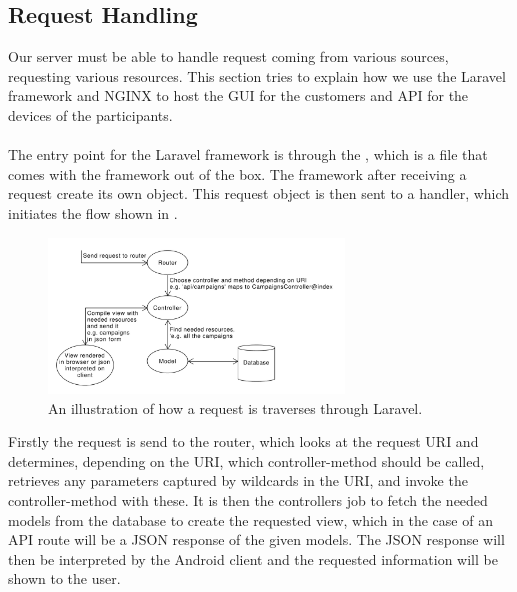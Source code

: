 \subsection{Request Handling}
\label{sub:request_handling}
Our server must be able to handle request coming from various sources, requesting various resources. This section tries to explain how we use the Laravel framework and NGINX to host the GUI for the customers and API for the devices of the participants.
\\\\
The entry point for the Laravel framework is through the , which is a file that comes with the framework out of the box. The framework after receiving a request create its own  object. This request object is then sent to a handler, which initiates the flow shown in .

\begin{figure}[!htbp]
    \centering
    \includegraphics[width=0.7\textwidth]{graphic/architecture/laravel_flow.pdf}
    \caption{An illustration of how a request is traverses through Laravel.}
    \label{fig:laravel_flow}
\end{figure}
\FloatBarrier

Firstly the request is send to the router, which looks at the request URI and determines, depending on the URI, which controller-method should be called, retrieves any parameters captured by wildcards in the URI, and invoke the controller-method with these. It is then the controllers job to fetch the needed models from the database to create the requested view, which in the case of an API route will be a JSON response of the given models. The JSON response will then be interpreted by the Android client and the requested information will be shown to the user. 

